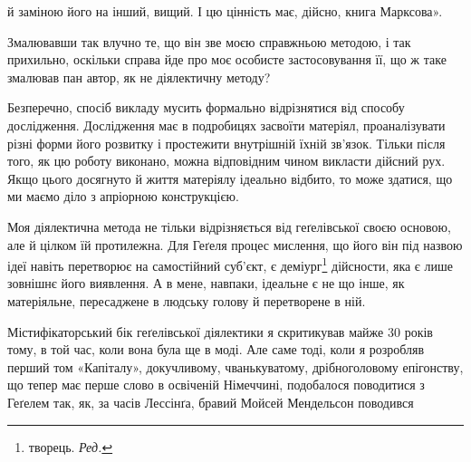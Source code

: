 \parcont{}  %
й заміною його на інший, вищий. І цю цінність має, дійсно,
книга Марксова».

Змалювавши так влучно те, що він зве моєю справжньою методою,
і так прихильно, оскільки справа йде про моє особисте
застосовування її, що ж таке змалював пан автор, як не діялектичну
методу?

Безперечно, спосіб викладу мусить формально відрізнятися
від способу дослідження. Дослідження має в подробицях засвоїти
матеріял, проаналізувати різні форми його розвитку і простежити
внутрішній їхній зв’язок. Тільки після того, як цю роботу виконано,
можна відповідним чином викласти дійсний рух. Якщо
цього досягнуто й життя матеріялу ідеально відбито, то може здатися,
що ми маємо діло з апріорною конструкцією.

Моя діялектична метода не тільки відрізняється від геґелівської
своєю основою, але й цілком їй протилежна. Для Геґеля процес
мислення, що його він під назвою ідеї навіть перетворює на самостійний
суб’єкт, є деміург\footnote*{
творець. \emph{Ред.}
} дійсности, яка є лише зовнішнє його
виявлення. А в мене, навпаки, ідеальне є не що інше, як матеріяльне,
пересаджене в людську голову й перетворене в ній.

Містифікаторський бік геґелівської діялектики я скритикував майже
30 років тому, в той час, коли вона була ще в моді. Але саме
тоді, коли я розробляв перший том «Капіталу», докучливому,
чванькуватому, дрібноголовому епігонству, що тепер має перше
слово в освіченій Німеччині, подобалося поводитися з Геґелем
так, як, за часів Лессінґа, бравий Мойсей Мендельсон поводився
\parbreak{}  %
